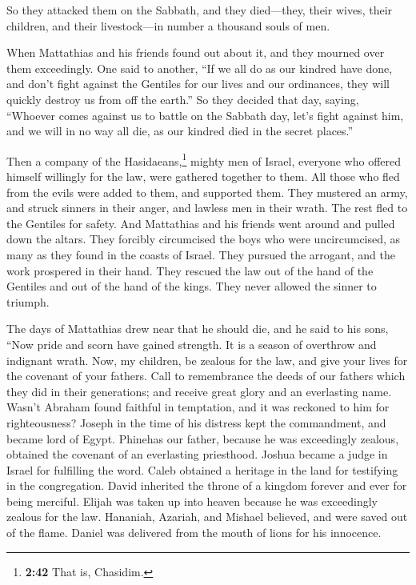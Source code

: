  So they attacked them on the Sabbath, and they
died---they, their wives, their children, and their livestock---in
number a thousand souls of men.

 When Mattathias and his friends found out about it, and
they mourned over them exceedingly.  One said to another,
``If we all do as our kindred have done, and don't fight against the
Gentiles for our lives and our ordinances, they will quickly destroy us
from off the earth.''  So they decided that day, saying,
``Whoever comes against us to battle on the Sabbath day, let's fight
against him, and we will in no way all die, as our kindred died in the
secret places.''

 Then a company of the Hasidaeans,\footnote{\textbf{2:42}
  That is, Chasidim.} mighty men of Israel, everyone who offered himself
willingly for the law, were gathered together to them. 
All those who fled from the evils were added to them, and supported
them.  They mustered an army, and struck sinners in their
anger, and lawless men in their wrath. The rest fled to the Gentiles for
safety.  And Mattathias and his friends went around and
pulled down the altars.  They forcibly circumcised the
boys who were uncircumcised, as many as they found in the coasts of
Israel.  They pursued the arrogant, and the work
prospered in their hand.  They rescued the law out of the
hand of the Gentiles and out of the hand of the kings. They never
allowed the sinner to triumph.

 The days of Mattathias drew near that he should die, and
he said to his sons, ``Now pride and scorn have gained strength. It is a
season of overthrow and indignant wrath.  Now, my
children, be zealous for the law, and give your lives for the covenant
of your fathers.  Call to remembrance the deeds of our
fathers which they did in their generations; and receive great glory and
an everlasting name.  Wasn't Abraham found faithful in
temptation, and it was reckoned to him for righteousness?
 Joseph in the time of his distress kept the commandment,
and became lord of Egypt.  Phinehas our father, because
he was exceedingly zealous, obtained the covenant of an everlasting
priesthood.  Joshua became a judge in Israel for
fulfilling the word.  Caleb obtained a heritage in the
land for testifying in the congregation.  David inherited
the throne of a kingdom forever and ever for being merciful.
 Elijah was taken up into heaven because he was
exceedingly zealous for the law.  Hananiah, Azariah, and
Mishael believed, and were saved out of the flame. 
Daniel was delivered from the mouth of lions for his innocence.

